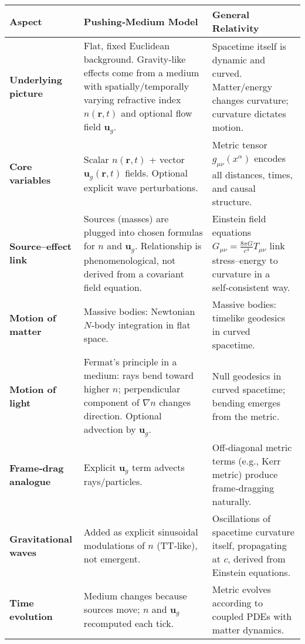 \usepackage{tabularx} %
\renewcommand{\arraystretch}{1.3} %

\begin{table}[h!]
\centering
\begin{tabularx}{\textwidth}{|p{3cm}|X|X|}
\hline
\textbf{Aspect} & \textbf{Pushing‑Medium Model} & \textbf{General Relativity} \\
\hline
\textbf{Underlying picture} &
Flat, fixed Euclidean background. Gravity‑like effects come from a medium with spatially/temporally varying refractive index $n(\mathbf{r},t)$ and optional flow field $\mathbf{u}_g$. &
Spacetime itself is dynamic and curved. Matter/energy changes curvature; curvature dictates motion. \\
\hline
\textbf{Core variables} &
Scalar $n(\mathbf{r},t)$ + vector $\mathbf{u}_g(\mathbf{r},t)$ fields. Optional explicit wave perturbations. &
Metric tensor $g_{\mu\nu}(x^\alpha)$ encodes all distances, times, and causal structure. \\
\hline
\textbf{Source--effect link} &
Sources (masses) are plugged into chosen formulas for $n$ and $\mathbf{u}_g$. Relationship is phenomenological, not derived from a covariant field equation. &
Einstein field equations $G_{\mu\nu} = \frac{8\pi G}{c^4}T_{\mu\nu}$ link stress--energy to curvature in a self‑consistent way. \\
\hline
\textbf{Motion of matter} &
Massive bodies: Newtonian $N$‑body integration in flat space. &
Massive bodies: timelike geodesics in curved spacetime. \\
\hline
\textbf{Motion of light} &
Fermat’s principle in a medium: rays bend toward higher $n$; perpendicular component of $\nabla n$ changes direction. Optional advection by $\mathbf{u}_g$. &
Null geodesics in curved spacetime; bending emerges from the metric. \\
\hline
\textbf{Frame‑drag analogue} &
Explicit $\mathbf{u}_g$ term advects rays/particles. &
Off‑diagonal metric terms (e.g., Kerr metric) produce frame‑dragging naturally. \\
\hline
\textbf{Gravitational waves} &
Added as explicit sinusoidal modulations of $n$ (TT‑like), not emergent. &
Oscillations of spacetime curvature itself, propagating at $c$, derived from Einstein equations. \\
\hline
\textbf{Time evolution} &
Medium changes because sources move; $n$ and $\mathbf{u}_g$ recomputed each tick. &
Metric evolves according to coupled PDEs with matter dynamics. \\

\end{tabularx}
\end{table}
